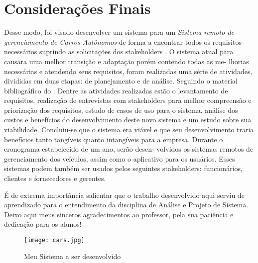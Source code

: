 

\chapter{Considera\c{c}\~{o}es Finais}


Desse modo, foi visado desenvolver um sistema para um \textit{Sistema remoto de gerenciamento de Carros Autônomos} de forma a encontrar todos os requisitos necessários suprindo as solicitações dos stakeholders .
O sistema atual para causara uma melhor transição e adaptação porém contendo todas as me- lhorias necessárias e atendendo seus requisitos, foram realizadas uma série de atividades, divididas em duas etapas: de planejamento e de análise. Seguindo o material bibliográfico do \cite{Dennis2014}.
Dentre as atividades realizadas estão o levantamento de requisitos, realização de entrevistas com stakeholders para melhor compreensão e priorização dos requisitos, estudo de casos de uso para o sistema, análise dos custos e benefícios do desenvolvimento deste novo sistema e um estudo sobre sua viabilidade. Concluiu-se que o sistema era viável e que seu desenvolvimento traria benefícios tanto tangíveis quanto intangíveis para a empresa.
Durante o cronograma estabelecido de um ano, serão desen- volvidos os sistemas remotos de gerenciamento dos veículos, assim como o aplicativo para os usuários.
 Esses sistemas podem também ser usados pelos seguintes stakeholders: funcionários, clientes e fornecedores e gerentes.

É de extrema importância salientar que o trabalho desenvolvido aqui serviu de aprendizado para o entendimento da disciplina de Análise e Projeto de Sistema. Deixo aqui meus sinceros agradecimentos ao professor, pela sua paciência e dedicação para os alunos!



   \begin{figure}[H]
    \begin{center}
        \texttt{[image: cars.jpg]}
        \caption{Meu Sistema a ser desenvolvido} \label{sistema}
    \end{center}
   \end{figure}
